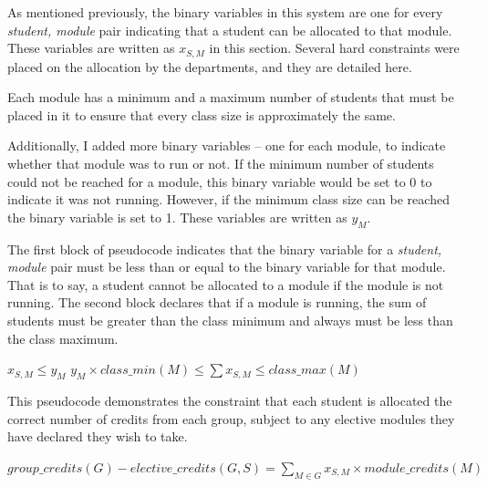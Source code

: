 As mentioned previously, the binary variables in this system are one for every
\emph{student, module} pair indicating that a student can be allocated to that
module. These variables are written as $x_{S,M}$ in this section. Several hard
constraints were placed on the allocation by the departments, and they are
detailed here.


Each module has a minimum and a maximum number of students that must be placed
in it to ensure that every class size is approximately the same.

Additionally, I added more binary variables -- one for each module, to
indicate whether that module was to run or not. If the minimum number of
students could not be reached for a module, this binary variable would be set
to 0 to indicate it was not running. However, if the minimum class size can be
reached the binary variable is set to 1. These variables are written as
$y_{M}$.

The first block of pseudocode indicates that the binary variable for a
\emph{student, module} pair must be less than or equal to the binary variable
for that module. That is to say, a student cannot be allocated to a module if
the module is not running. The second block declares that if a module is
running, the sum of students must be greater than the class minimum and always
must be less than the class maximum.

\begin{spacing}{1.6}
\begin{algorithmic}
  \STATE $x_{S,M} \leq y_{M}$
\ENDFOR
{}
  \STATE $y_{M} \times class\_min(M) \leq \displaystyle\sum x_{S,M} \leq class\_max(M)$
\ENDFOR
\end{algorithmic}
\end{spacing}


This pseudocode demonstrates the constraint that each student is allocated the
correct number of credits from each group, subject to any elective modules
they have declared they wish to take.

\begin{spacing}{1.6}
\begin{algorithmic}
      \STATE $group\_credits(G) - elective\_credits(G,S) = \displaystyle\sum_{M \in G} x_{S,M} \times module\_credits(M)$
    \ENDIF
  \ENDFOR
\ENDFOR
\end{algorithmic}
\end{spacing}

